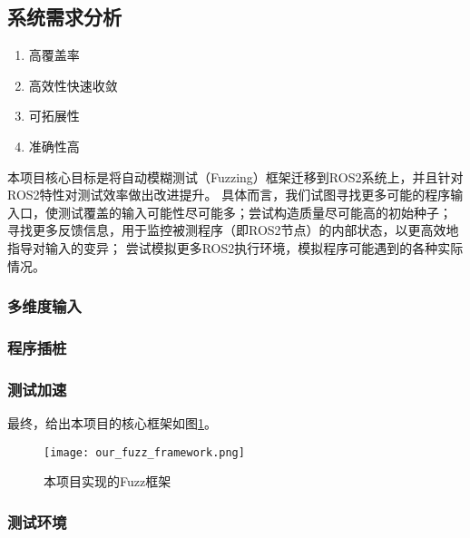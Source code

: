\subsection{系统需求分析}
\setParDis %
\begin{enumerate}
  \item 高覆盖率
  \item 高效性快速收敛
  \item 可拓展性
  \item 准确性高
\end{enumerate}
本项目核心目标是将自动模糊测试（Fuzzing）框架迁移到ROS2系统上，并且针对ROS2特性对测试效率做出改进提升。
具体而言，我们试图寻找更多可能的程序输入口，使测试覆盖的输入可能性尽可能多；尝试构造质量尽可能高的初始种子；
寻找更多反馈信息，用于监控被测程序（即ROS2节点）的内部状态，以更高效地指导对输入的变异；
尝试模拟更多ROS2执行环境，模拟程序可能遇到的各种实际情况。

\subsubsection{多维度输入}
\subsubsection{程序插桩}
\subsubsection{测试加速}


最终，给出本项目的核心框架如图\ref{pic:off}。

\begin{figure}[h]
    \centering
    \texttt{[image: our\_fuzz\_framework.png]}
    \caption{本项目实现的Fuzz框架}
    \label{pic:off}
\end{figure}

\subsubsection{测试环境}